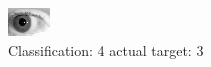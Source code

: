 \begin{figure}[h!]
\begin{center}
\includegraphics[width=0.60\columnwidth]{figures/ID177_class_4_target_3.png}
\end{center}
\caption{ Classification: 4 actual target: 3}
\label{fig:ID177_class_4_target_3}
\end{figure}
